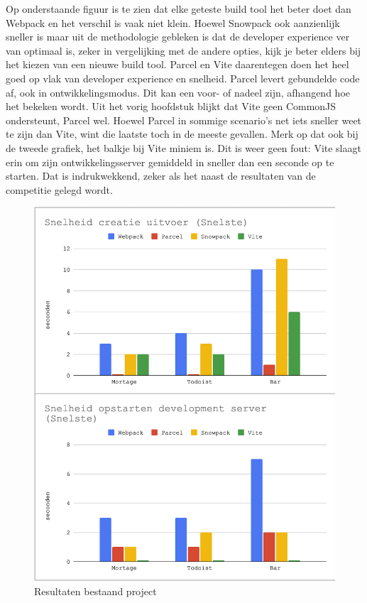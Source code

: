 Op onderstaande figuur is te zien dat elke geteste build tool het beter doet dan Webpack en het verschil is vaak niet klein. Hoewel Snowpack ook aanzienlijk sneller is maar uit de methodologie gebleken is dat de developer experience ver van optimaal is, zeker in vergelijking met de andere opties, kijk je beter elders bij het kiezen van een nieuwe build tool. Parcel en Vite daarentegen doen het heel goed op vlak van developer experience en snelheid. Parcel levert gebundelde code af, ook in ontwikkelingsmodus. Dit kan een voor- of nadeel zijn, afhangend hoe het bekeken wordt. Uit het vorig hoofdstuk blijkt dat Vite geen CommonJS ondersteunt, Parcel wel. Hoewel Parcel in sommige scenario’s net iets sneller weet te zijn dan Vite, wint die laatste toch in de meeste gevallen. Merk op dat ook bij de tweede grafiek, het balkje bij Vite miniem is. Dit is weer geen fout: Vite slaagt erin om zijn ontwikkelingsserver gemiddeld in sneller dan een seconde op te starten. Dat is indrukwekkend, zeker als het naast de resultaten van de competitie gelegd wordt.

\begin{figure}[h]
   \includegraphics[scale=0.6]{conclusieBestaand}
       \centering
       \caption{Resultaten bestaand project}
 \end{figure}
 
